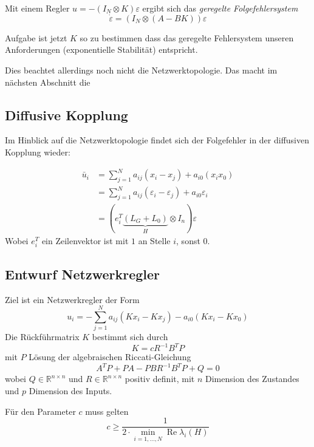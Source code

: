 Mit einem Regler $u=-(I_N \otimes K)\varepsilon$  ergibt sich das
\emph{geregelte Folgefehlersystem}
\begin{equation}
    \dot{\varepsilon} = (I_N \otimes (A-BK))\varepsilon
\end{equation}

Aufgabe ist jetzt $K$ so zu bestimmen dass das geregelte Fehlersystem unseren
Anforderungen (exponentielle Stabilität) entspricht.

Dies beachtet allerdings noch nicht die Netzwerktopologie.
Das macht im nächsten Abschnitt die

\subsection{Diffusive Kopplung}
Im Hinblick auf die Netzwerktopologie findet sich der Folgefehler in der
diffusiven Kopplung wieder:

\begin{align}
    \bar{u}_i &= \sum_{j=1}^N a_{ij} (x_i-x_j) + a_{i0}(x_ix_0) \\
    &= \sum_{j=1}^N a_{ij} (\varepsilon_i - \varepsilon_j) + a_{i0} \varepsilon_i \\
    &= \left(e_i^T\underbrace{(L_G+L_0)}_H \otimes I_n\right)\varepsilon
\end{align}
Wobei $e_i^T$ ein Zeilenvektor ist mit $1$ an Stelle $i$, sonst $0$.

\subsection{Entwurf Netzwerkregler}

Ziel ist ein Netzwerkregler der Form
\begin{equation}
    u_i = -\sum_{j=1}^N a_{ij} (Kx_i - Kx_j) - a_{i0} (Kx_i - Kx_0)
\end{equation}
Die Rückführmatrix $K$ bestimmt sich durch
\begin{equation}
    K=c R^{-1} B^T P
\end{equation}
mit $P$ Lösung der algebraischen Riccati-Gleichung
\begin{equation}
    \tag{ARE}
    A^T P + P A - P B R^{-1} B^T P + Q = 0
\end{equation}
wobei $Q \in \mathbb{R}^{n\times n}$ und $R \in \mathbb{R}^{n\times n}$
positiv definit, mit $n$ Dimension des Zustandes und $p$ Dimension des
Inputs.

Für den Parameter $c$ muss gelten
\begin{equation}
    c \geq \frac{1}{2 \cdot \min_{i=1,\ldots,N} \operatorname{Re} \lambda_i(H)}
\end{equation}

